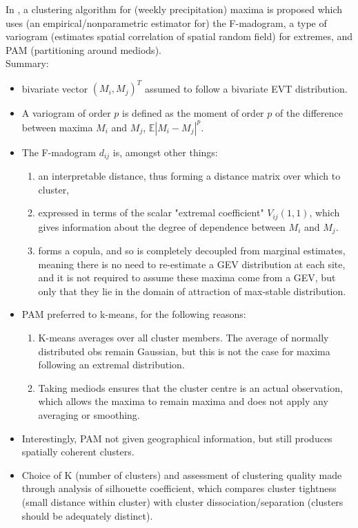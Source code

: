 \documentclass{article}
\numberwithin{equation}{section}
\begin{document}
In \cite{Bernard2013}, a clustering algorithm for (weekly precipitation) maxima is proposed which uses (an empirical/nonparametric estimator for) the F-madogram, a type of variogram (estimates spatial correlation of spatial random field) for extremes, and PAM (partitioning around mediods). \\
Summary:
\begin{itemize}
  \item bivariate vector $(M_i, M_j)^T$ assumed to follow a bivariate EVT distribution.
  \item A variogram of order $p$ is defined as the moment of order $p$ of the difference between maxima $M_i$ and $M_j$, $\mathbb{E}|M_i - M_j|^p$.
  \item The F-madogram $d_{ij}$ is, amongst other things:
    \begin{enumerate}
      \item an interpretable distance, thus forming a distance matrix over which to cluster,
      \item expressed in terms of the scalar "extremal coefficient" $V_{ij}(1, 1)$, which gives information about the degree of dependence between $M_i$ and $M_j$. 
      \item forms a copula, and so is completely decoupled from marginal estimates, meaning there is no need to re-estimate a GEV distribution at each site, and it is not required to assume these maxima come from a GEV, but only that they lie in the domain of attraction of max-stable distribution. 
    \end{enumerate}
  \item PAM preferred to k-means, for the following reasons:
    \begin{enumerate}
      \item K-means averages over all cluster members. 
      The average of normally distributed obs remain Gaussian, but this is not the case for maxima following an extremal distribution.
      \item Taking mediods ensures that the cluster centre is an actual observation, which allows the maxima to remain maxima and does not apply any averaging or smoothing. 
    \end{enumerate}
  \item Interestingly, PAM not given geographical information, but still produces spatially coherent clusters. 
  \item Choice of K (number of clusters) and assessment of clustering quality made through analysis of silhouette coefficient, which compares cluster tightness (small distance within cluster) with cluster dissociation/separation (clusters should be adequately distinct).
\end{itemize}
\end{document}
